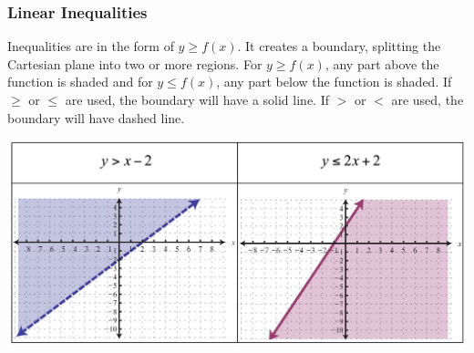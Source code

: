 \subsubsection{Linear Inequalities}
Inequalities are in the form of $y\geq f(x)$. It creates a boundary, splitting the Cartesian plane into two or more regions. For $y\geq f(x)$, any part above the function is shaded and for $y\leq f(x)$, any part below the function is shaded. If $\geq$ or $\leq$ are used, the boundary will have a solid line. If $>$ or $<$ are used, the boundary will have dashed line.\\
\centerline{\includegraphics[scale = 0.3]{Images/PreCalcPictures/LinearInequalities.jpg}}